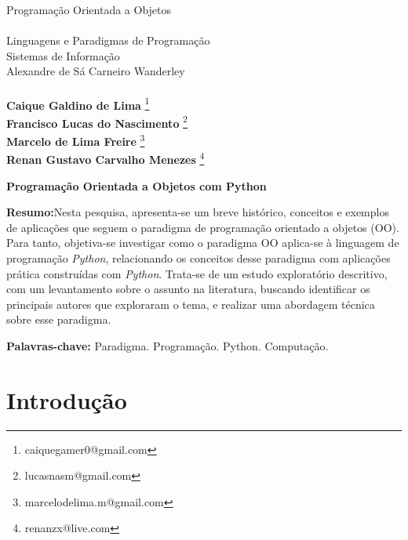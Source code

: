 \documentclass[11pt,a4paper]{article}
\makeatletter
\newcommand{\aluno}{{\bf Caique Galdino de Lima}
	\footnote{caiquegamer0@gmail.com}}
\newcommand{\alunodois}{{\bf Francisco Lucas do Nascimento}
	\footnote{lucasnasm@gmail.com}}
\newcommand{\alunotres}{{\bf  Marcelo de Lima Freire}
	\footnote{marcelodelima.m@gmail.com}}
\newcommand{\alunoquatro}{{\bf Renan Gustavo Carvalho Menezes}
	\footnote{renanzx@live.com}}
\newcommand{\prof}{{ Alexandre de  S\'a Carneiro Wanderley}}
\newcommand{\titu}{Programação Orientada a Objetos}
\newcommand{\disc}{Linguagens e Paradigmas de Programação}
\newcommand{\curso}{Sistemas de Informação}
\makeatother
\begin{document}
\Large
\begin{center} \titu \\ \ \\ \disc\\ \curso \\ \prof \\ \ \\ \aluno \\ \alunodois \\ \alunotres \\ \alunoquatro
\end{center}

\vspace{0.9in}
\vspace{0.9in}
\begin{center}\textbf{Programação Orientada a Objetos com Python }\end{center}

\newpage 
\tableofcontents
\vspace{0.9in}
\vspace{0.9in}


\segundapagina
% 
\begin{footnotesize}{\normalsize \noindent \textbf{Resumo:}Nesta pesquisa, apresenta-se um breve histórico, conceitos e exemplos de aplicações que seguem o paradigma de programação orientado a objetos (OO). 
Para tanto, objetiva-se investigar como o paradigma OO aplica-se à linguagem de 
programação \textit{Python}, relacionando os conceitos desse paradigma com aplicações prática construídas com \textit{Python}. 
Trata-se de um estudo exploratório descritivo, com um levantamento sobre o assunto na literatura, buscando identificar os principais autores que exploraram o tema, e realizar uma abordagem técnica sobre esse paradigma. 

\noindent\textbf{Palavras-chave:} Paradigma. Programação. Python. Computação.}
\end{footnotesize}
% 
% 
\segundapagina

\section{Introdução}
\end{document}
